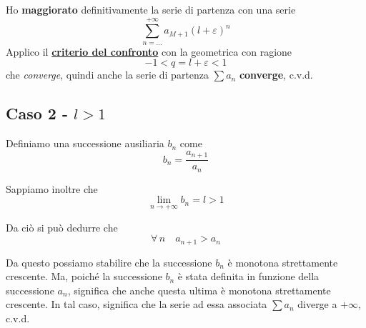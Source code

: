 \documentclass[../../dimostrazioni]{subfiles}
\begin{document}
                Ho \textbf{maggiorato} definitivamente la serie di partenza con una serie
                \[ \sum_{n=\dots}^{+\infty} a_{M+1}(l + \varepsilon)^{n}\] 
                Applico il \textbf{\hyperref[serieconfronto]{criterio del confronto}} con la geometrica con ragione
                \[-1 < q = l + \varepsilon < 1 \]
                che \emph{converge}, quindi anche la serie di partenza \(\sum a_n \) \textbf{converge}, c.v.d.

            \subsection*{Caso 2 - \(l > 1\)}
                
                Definiamo una successione ausiliaria \(b_n\) come
                \[b_n = \frac{a_{n+1}}{a_n}\]

                Sappiamo inoltre che
                \[ \lim_{n \to +\infty}b_n = l > 1 \]

                Da ciò si può dedurre che
                \[\forall \, n \quad a_{n + 1} > a_n\]

                Da questo possiamo stabilire che la successione \(b_n\) è monotona strettamente crescente. Ma,
                poiché la successione \(b_n\) è stata definita in funzione della successione \(a_n\), significa
                che anche questa ultima è monotona strettamente crescente. In tal caso, significa che la serie ad
                essa associata \(\sum a_n\) diverge a \(+\infty\), c.v.d.
                
\end{document}
